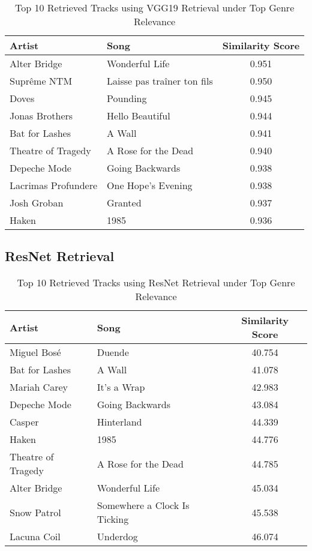 \documentclass[sigconf]{acmart}
\begin{document}
\begin{table}[H]
    \centering
    \caption{Top 10 Retrieved Tracks using VGG19 Retrieval under Top Genre Relevance}
    \label{tab:retrieved_vgg19_top_genre_specific}
    \footnotesize
    \begin{tabular}{l l c}
        \toprule
        \textbf{Artist} & \textbf{Song} & \textbf{Similarity Score} \\
        \midrule
        Alter Bridge & Wonderful Life & 0.951 \\
        Suprême NTM & Laisse pas traîner ton fils & 0.950 \\
        Doves & Pounding & 0.945 \\
        Jonas Brothers & Hello Beautiful & 0.944 \\
        Bat for Lashes & A Wall & 0.941 \\
        Theatre of Tragedy & A Rose for the Dead & 0.940 \\
        Depeche Mode & Going Backwards & 0.938 \\
        Lacrimas Profundere & One Hope's Evening & 0.938 \\
        Josh Groban & Granted & 0.937 \\
        Haken & 1985 & 0.936 \\
        \bottomrule
    \end{tabular}
\end{table}

\subsection{ResNet Retrieval}


\begin{table}[H]
    \centering
    \caption{Top 10 Retrieved Tracks using ResNet Retrieval under Top Genre Relevance}
    \label{tab:retrieved_resnet_top_genre_specific}
    \footnotesize
    \begin{tabular}{l l c}
        \toprule
        \textbf{Artist} & \textbf{Song} & \textbf{Similarity Score} \\
        \midrule
        Miguel Bosé & Duende & 40.754 \\
        Bat for Lashes & A Wall & 41.078 \\
        Mariah Carey & It's a Wrap & 42.983 \\
        Depeche Mode & Going Backwards & 43.084 \\
        Casper & Hinterland & 44.339 \\
        Haken & 1985 & 44.776 \\
        Theatre of Tragedy & A Rose for the Dead & 44.785 \\
        Alter Bridge & Wonderful Life & 45.034 \\
        Snow Patrol & Somewhere a Clock Is Ticking & 45.538 \\
        Lacuna Coil & Underdog & 46.074 \\
        \bottomrule
    \end{tabular}
\end{table}
\end{document}
